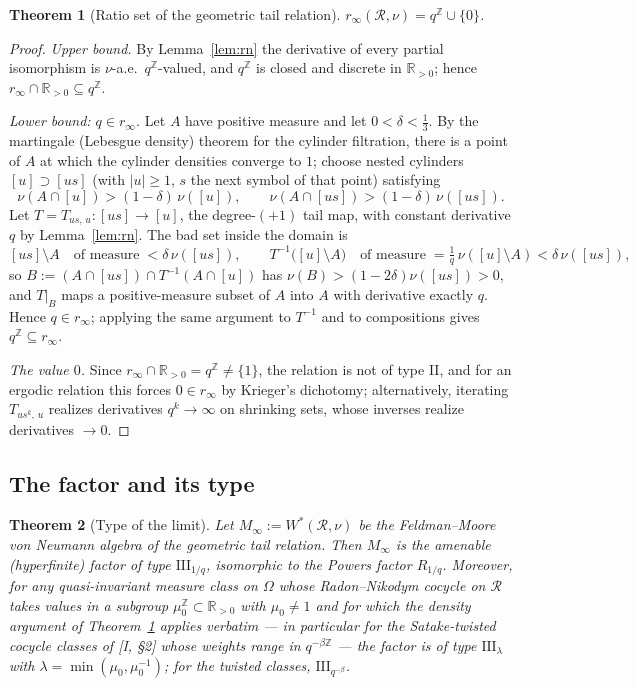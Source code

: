 \documentclass[11pt]{amsart}
\numberwithin{equation}{section}
\newtheorem{theorem}{Theorem}[section]
\theoremstyle{definition}
\theoremstyle{remark}
\newcommand{\Z}{\mathbb{Z}}
\newcommand{\R}{\mathbb{R}}
\newcommand{\cR}{\mathcal{R}}
\begin{document}
\begin{theorem}[Ratio set of the geometric tail relation]\label{thm:ratio}
$r_\infty(\cR,\nu)=q^{\Z}\cup\{0\}$.
\end{theorem}

\begin{proof}
\emph{Upper bound.} By Lemma~\ref{lem:rn} the derivative of every partial isomorphism
is $\nu$-a.e.\ $q^{\Z}$-valued, and $q^{\Z}$ is closed and discrete in $\R_{>0}$; hence
$r_\infty\cap\R_{>0}\subseteq q^{\Z}$.

\emph{Lower bound: $q\in r_\infty$.} Let $A$ have positive measure and let
$0<\delta<\tfrac13$. By the martingale (Lebesgue density) theorem for the cylinder
filtration, there is a point of $A$ at which the cylinder densities converge to $1$;
choose nested cylinders $[u]\supset[us]$ (with $|u|\ge1$, $s$ the next symbol of that
point) satisfying
\[
\nu(A\cap[u])>(1-\delta)\,\nu([u]),\qquad
\nu(A\cap[us])>(1-\delta)\,\nu([us]).
\]
Let $T=T_{us,\,u}\colon[us]\to[u]$, the degree-$(+1)$ tail map, with constant
derivative $q$ by Lemma~\ref{lem:rn}. The bad set inside the domain is
\[
[us]\setminus A\quad\text{of measure}\;<\delta\,\nu([us]),
\qquad
T^{-1}\bigl([u]\setminus A\bigr)\quad\text{of measure}\;
=\tfrac1q\,\nu([u]\setminus A)<\delta\,\nu([us]),
\]
so $B:=(A\cap[us])\cap T^{-1}(A\cap[u])$ has $\nu(B)>(1-2\delta)\nu([us])>0$, and
$T|_B$ maps a positive-measure subset of $A$ into $A$ with derivative exactly $q$.
Hence $q\in r_\infty$; applying the same argument to $T^{-1}$ and to compositions
gives $q^{\Z}\subseteq r_\infty$.

\emph{The value $0$.} Since $r_\infty\cap\R_{>0}=q^{\Z}\neq\{1\}$, the relation is not
of type II, and for an ergodic relation this forces $0\in r_\infty$ by Krieger's
dichotomy; alternatively, iterating $T_{us^k,\,u}$ realizes derivatives $q^{k}\to\infty$
on shrinking sets, whose inverses realize derivatives $\to0$.
\end{proof}

\subsection{The factor and its type}

\begin{theorem}[Type of the limit]\label{thm:type}
Let $M_\infty:=W^*(\cR,\nu)$ be the Feldman--Moore von Neumann algebra of the
geometric tail relation. Then $M_\infty$ is the amenable (hyperfinite) factor of type
$\mathrm{III}_{1/q}$, isomorphic to the Powers factor $R_{1/q}$. Moreover, for any
quasi-invariant measure class on $\Omega$ whose Radon--Nikodym cocycle on $\cR$ takes
values in a subgroup $\mu_0^{\Z}\subset\R_{>0}$ with $\mu_0\neq1$ and for which the
density argument of Theorem~\ref{thm:ratio} applies verbatim --- in particular for the
Satake-twisted cocycle classes of [I, \S2] whose weights range in $q^{-\beta\Z}$ ---
the factor is of type $\mathrm{III}_{\lambda}$ with
$\lambda=\min(\mu_0,\mu_0^{-1})$; for the twisted classes,
$\mathrm{III}_{q^{-\beta}}$.
\end{theorem}
\end{document}
